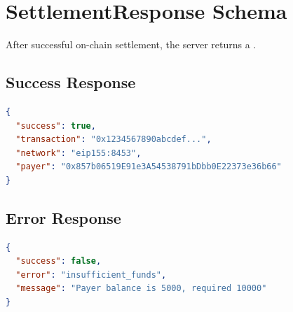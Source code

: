 \begin{algorithm}[H]
\caption{PaymentPayload Validation}
\label{alg:payload-validation}

\BlankLine
{}

\BlankLine
{}

\BlankLine
{}

\BlankLine
{}

\BlankLine
{}

\end{algorithm}

\section{SettlementResponse Schema}
\label{sec:settlement-response}

After successful on-chain settlement, the server returns a .

\subsection{Success Response}

\begin{lstlisting}[language=json,caption={Successful settlement response}]
{
  "success": true,
  "transaction": "0x1234567890abcdef...",
  "network": "eip155:8453",
  "payer": "0x857b06519E91e3A54538791bDbb0E22373e36b66"
}
\end{lstlisting}

\subsection{Error Response}

\begin{lstlisting}[language=json,caption={Failed settlement response}]
{
  "success": false,
  "error": "insufficient_funds",
  "message": "Payer balance is 5000, required 10000"
}
\end{lstlisting}

